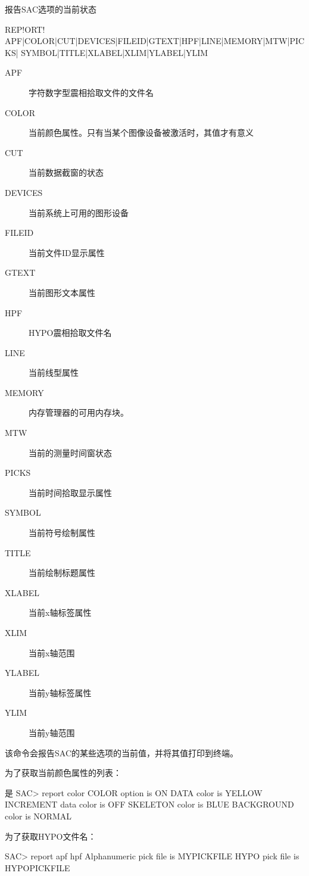 \label{cmd:report}

报告SAC选项的当前状态

\begin{SACSTX}
REP!ORT! APF|COLOR|CUT|DEVICES|FILEID|GTEXT|HPF|LINE|MEMORY|MTW|PICKS|
    SYMBOL|TITLE|XLABEL|XLIM|YLABEL|YLIM
\end{SACSTX}

\begin{description}
\item [APF] 字符数字型震相拾取文件的文件名
\item [COLOR] 当前颜色属性。只有当某个图像设备被激活时，其值才有意义
\item [CUT] 当前数据截窗的状态
\item [DEVICES] 当前系统上可用的图形设备
\item [FILEID] 当前文件ID显示属性
\item [GTEXT] 当前图形文本属性
\item [HPF] HYPO震相拾取文件名
\item [LINE] 当前线型属性
\item [MEMORY] 内存管理器的可用内存块。
\item [MTW] 当前的测量时间窗状态
\item [PICKS] 当前时间拾取显示属性
\item [SYMBOL] 当前符号绘制属性
\item [TITLE] 当前绘制标题属性
\item [XLABEL] 当前x轴标签属性
\item [XLIM] 当前x轴范围
\item [YLABEL] 当前y轴标签属性
\item [YLIM] 当前y轴范围
\end{description}

该命令会报告SAC的某些选项的当前值，并将其值打印到终端。

为了获取当前颜色属性的列表：
\begin{SACCode}是
SAC> report color
 COLOR option is ON
 DATA color is YELLOW
 INCREMENT data color is OFF
 SKELETON color is BLUE
 BACKGROUND color is NORMAL
\end{SACCode}

为了获取HYPO文件名：
\begin{SACCode}
SAC> report apf hpf
 Alphanumeric pick file is MYPICKFILE
 HYPO pick file is HYPOPICKFILE
\end{SACCode}
